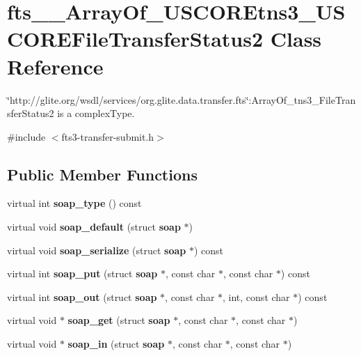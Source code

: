 \section{fts\_\-\_\-ArrayOf\_\-USCOREtns3\_\-USCOREFileTransferStatus2 Class Reference}
\label{classfts____ArrayOf__USCOREtns3__USCOREFileTransferStatus2}


\char`\"{}http://glite.org/wsdl/services/org.glite.data.transfer.fts\char`\"{}:ArrayOf\_\-tns3\_\-FileTransferStatus2 is a complexType.  




{\ttfamily \#include $<$fts3-\/transfer-\/submit.h$>$}

\subsection*{Public Member Functions}
\begin{DoxyCompactItemize}
\item 
virtual int {\bfseries soap\_\-type} () const \label{classfts____ArrayOf__USCOREtns3__USCOREFileTransferStatus2_a835b27b3b74b4cf26a6780a55b0d8506}

\item 
virtual void {\bfseries soap\_\-default} (struct {\bf soap} $\ast$)\label{classfts____ArrayOf__USCOREtns3__USCOREFileTransferStatus2_af5c1bbf5181928c270944885aacab078}

\item 
virtual void {\bfseries soap\_\-serialize} (struct {\bf soap} $\ast$) const \label{classfts____ArrayOf__USCOREtns3__USCOREFileTransferStatus2_a04120e1f81fe36859c3d2ffae95ebe60}

\item 
virtual int {\bfseries soap\_\-put} (struct {\bf soap} $\ast$, const char $\ast$, const char $\ast$) const \label{classfts____ArrayOf__USCOREtns3__USCOREFileTransferStatus2_adb49d009a53b10250df19ae9460c9d45}

\item 
virtual int {\bfseries soap\_\-out} (struct {\bf soap} $\ast$, const char $\ast$, int, const char $\ast$) const \label{classfts____ArrayOf__USCOREtns3__USCOREFileTransferStatus2_a28ab28cf2602939543dca589278cb750}

\item 
virtual void $\ast$ {\bfseries soap\_\-get} (struct {\bf soap} $\ast$, const char $\ast$, const char $\ast$)\label{classfts____ArrayOf__USCOREtns3__USCOREFileTransferStatus2_a8dfd09859da0c4c376c715f34abd2299}

\item 
virtual void $\ast$ {\bfseries soap\_\-in} (struct {\bf soap} $\ast$, const char $\ast$, const char $\ast$)\label{classfts____ArrayOf__USCOREtns3__USCOREFileTransferStatus2_a19b06a3e98a88d246f5efd3ae54ea273}

\end{DoxyCompactItemize}
